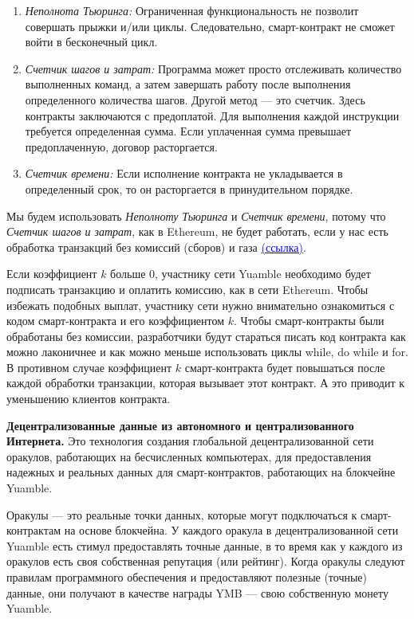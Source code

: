\documentclass[11pt]{article}
\begin{document}
\begin{multicols}{2}
\begin{enumerate}
\item \textit{Неполнота Тьюринга:} Ограниченная функциональность не позволит совершать прыжки и/или циклы. Следовательно, смарт-контракт не сможет войти в бесконечный цикл.

\item \textit{Счетчик шагов и затрат:} Программа может просто отслеживать количество выполненных команд, а затем завершать работу после выполнения определенного количества шагов. Другой метод — это счетчик. Здесь контракты заключаются с предоплатой. Для выполнения каждой инструкции требуется определенная сумма. Если уплаченная сумма превышает предоплаченную, договор расторгается.

\item \textit{Счетчик времени:} Если исполнение контракта не укладывается в определенный срок, то он расторгается в принудительном порядке.

\end{enumerate}
Мы будем использовать \textit{Неполноту Тьюринга} и \textit{Счетчик времени}, потому что \textit{Счетчик шагов и затрат}, как в Ethereum, не будет работать, если у нас есть обработка транзакций без комиссий (сборов) и газа \href{https://ethereum.org/en/developers/docs/gas/}{\textcolor{blue}{(ссылка)}}.

Если коэффициент $k$ больше 0, участнику сети Yuamble необходимо будет подписать транзакцию и оплатить комиссию, как в сети Ethereum. Чтобы избежать подобных выплат, участнику сети нужно внимательно ознакомиться с кодом смарт-контракта и его коэффициентом $k$. Чтобы смарт-контракты были обработаны без комиссии, разработчики будут стараться писать код контракта как можно лаконичнее и как можно меньше использовать циклы while, do while и for. В противном случае коэффициент $k$ смарт-контракта будет повышаться после каждой обработки транзакции, которая вызывает этот контракт. А это приводит к уменьшению клиентов контракта.

\vspace{1\baselineskip}
\textbf{Децентрализованные данные из автономного и централизованного Интернета.} Это технология создания глобальной децентрализованной сети оракулов, работающих на бесчисленных компьютерах, для предоставления надежных и реальных данных для смарт-контрактов, работающих на блокчейне Yuamble.

Оракулы — это реальные точки данных, которые могут подключаться к смарт-контрактам на основе блокчейна. У каждого оракула в децентрализованной сети Yuamble есть стимул предоставлять точные данные, в то время как у каждого из оракулов есть своя собственная репутация (или рейтинг). Когда оракулы следуют правилам программного обеспечения и предоставляют полезные (точные) данные, они получают в качестве награды YMB — свою собственную монету Yuamble.


\end{multicols}
\end{document}
